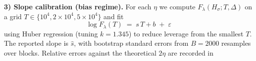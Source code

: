 \medskip
\noindent\textbf{3) Slope calibration (bias regime).}
For each $\eta$ we compute $F_\lambda(H_\sigma;T,\Delta)$ on a grid
$T\in\{10^4,2\times10^4,5\times10^4\}$ and fit
\[
\log F_\lambda(T) \;=\; s\,T + b \;+\; \varepsilon
\]
using Huber regression (tuning $k=1.345$) to reduce leverage from the
smallest $T$.  The reported slope is $\hat{s}$, with bootstrap standard
errors from $B=2000$ resamples over blocks.  Relative errors against the
theoretical $2\eta$ are recorded in \
